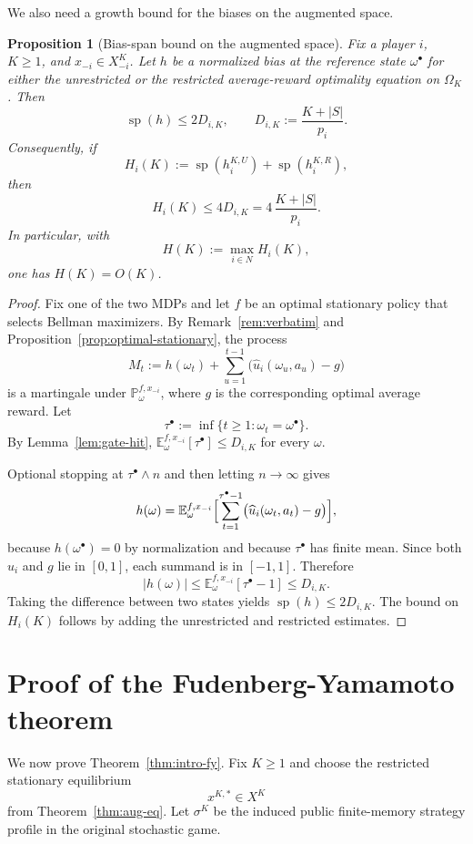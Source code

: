 \documentclass[11pt]{article}
\newtheorem{proposition}[theorem]{Proposition}
\theoremstyle{definition}
\newcommand{\E}{\mathbb{E}}
\newcommand{\Prob}{\mathbb{P}}
\newcommand{\1}{\mathbf{1}}
\DeclareMathOperator{\spn}{sp}
\begin{document}
We also need a growth bound for the biases on the augmented space.

\begin{proposition}[Bias-span bound on the augmented space]\label{prop:aug-bias-span}
Fix a player $i$, $K\ge1$, and $x_{-i}\in X_{-i}^K$. Let $h$ be a normalized bias at the reference state $\omega^\bullet$ for either the unrestricted or the restricted average-reward optimality equation on $\Omega_K$. Then
\[
\spn(h)\le 2D_{i,K},
\qquad
D_{i,K}:=\frac{K+|S|}{p_i}.
\]
Consequently, if
\[
H_i(K):=\spn(h_i^{K,U})+\spn(h_i^{K,R}),
\]
then
\[
H_i(K)\le 4D_{i,K}=4\,\frac{K+|S|}{p_i}.
\]
In particular, with
\[
H(K):=\max_{i\in N}H_i(K),
\]
one has $H(K)=O(K)$.
\end{proposition}

\begin{proof}
Fix one of the two MDPs and let $f$ be an optimal stationary policy that selects Bellman maximizers. By Remark~\ref{rem:verbatim} and Proposition~\ref{prop:optimal-stationary}, the process
\[
M_t:=h(\omega_t)+\sum_{u=1}^{t-1}\bigl(\widehat u_i(\omega_u,a_u)-g\bigr)
\]
is a martingale under $\Prob_{\omega}^{f,x_{-i}}$, where $g$ is the corresponding optimal average reward. Let
\[
\tau^\bullet:=\inf\{t\ge1:\omega_t=\omega^\bullet\}.
\]
By Lemma~\ref{lem:gate-hit}, $\E_{\omega}^{f,x_{-i}}[\tau^\bullet]\le D_{i,K}$ for every $\omega$.

Optional stopping at $\tau^\bullet\wedge n$ and then letting $n\to\infty$ gives
\[
h(\omega)
=
\E_{\omega}^{f,x_{-i}}
\Bigl[\sum_{t=1}^{\tau^\bullet-1}\bigl(\widehat u_i(\omega_t,a_t)-g\bigr)\Bigr],
\]
because $h(\omega^\bullet)=0$ by normalization and because $\tau^\bullet$ has finite mean. Since both $\widehat u_i$ and $g$ lie in $[0,1]$, each summand is in $[-1,1]$. Therefore
\[
|h(\omega)|\le \E_{\omega}^{f,x_{-i}}[\tau^\bullet-1]\le D_{i,K}.
\]
Taking the difference between two states yields $\spn(h)\le 2D_{i,K}$. The bound on $H_i(K)$ follows by adding the unrestricted and restricted estimates.
\end{proof}

\section{Proof of the Fudenberg-Yamamoto theorem}\label{sec:proof-fy}

We now prove Theorem~\ref{thm:intro-fy}. Fix $K\ge1$ and choose the restricted stationary equilibrium
\[
x^{K,*}\in X^K
\]
from Theorem~\ref{thm:aug-eq}. Let $\sigma^K$ be the induced public finite-memory strategy profile in the original stochastic game.
\end{document}
